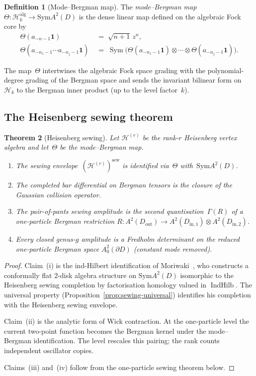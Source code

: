 \documentclass[11pt,reqno]{amsart}
\newtheorem{theorem}{Theorem}[section]
\theoremstyle{definition}
\newtheorem{definition}[theorem]{Definition}
\theoremstyle{remark}
\newcommand{\cH}{\mathcal{H}}
\newcommand{\Sym}{\mathrm{Sym}}
\newcommand{\GG}{\Gamma}
\numberwithin{equation}{section}
\begin{document}
\begin{definition}[Mode--Bergman map]\label{def:theta-map}
The \emph{mode--Bergman map}
$\Theta \colon \cH_k^{\mathrm{alg}} \to \Sym A^2(D)$
is the dense linear map defined on the algebraic Fock core by
\begin{align*}
\Theta(a_{-n-1}\mathbf{1})
&\;=\;
\sqrt{n+1}\, z^n,\\
\Theta(a_{-n_1-1}\cdots a_{-n_j-1}\mathbf{1})
&\;=\;
\operatorname{Sym}\bigl(\Theta(a_{-n_1-1}\mathbf{1})
\otimes \cdots \otimes
\Theta(a_{-n_j-1}\mathbf{1})\bigr).
\end{align*}
\end{definition}

The map~$\Theta$ intertwines the algebraic Fock space grading
with the polynomial-degree grading of the Bergman space and
sends the invariant bilinear form on~$\cH_k$ to the Bergman
inner product (up to the level factor~$k$).

\subsection{The Heisenberg sewing theorem}
\label{subsec:heisenberg-sewing-theorem}

\begin{theorem}[Heisenberg sewing]
\label{thm:heisenberg-sewing-vol1}
Let $\cH^{(r)}$ be the rank-$r$ Heisenberg vertex algebra and
let~$\Theta$ be the mode--Bergman map.
\begin{enumerate}[label=\textup{(\roman*)}]
\item The sewing envelope~$(\cH^{(r)})^{\mathrm{sew}}$ is
identified via~$\Theta$ with~$\Sym A^2(D)$.
\item The completed bar differential on Bergman tensors is the
closure of the Gaussian collision operator.
\item The pair-of-pants sewing amplitude is the second
quantisation~$\GG(R)$ of a one-particle Bergman restriction
$R \colon A^2(D_{\mathrm{out}}) \to
A^2(D_{\mathrm{in},1}) \otimes A^2(D_{\mathrm{in},2})$.
\item Every closed genus-$g$ amplitude is a Fredholm
determinant on the reduced one-particle Bergman space
$A^2_0(\partial D)$ (constant mode removed).
\end{enumerate}
\end{theorem}

\begin{proof}
Claim~(i) is the ind-Hilbert identification of
Moriwaki~\cite{Moriwaki26b}, who constructs a conformally flat
2-disk algebra structure on $\Sym A^2(D)$ isomorphic to the
Heisenberg sewing completion by factorisation homology valued
in $\operatorname{IndHilb}$.  The universal property
(Proposition~\ref{prop:sewing-universal}) identifies his
completion with the Heisenberg sewing envelope.

Claim~(ii) is the analytic form of Wick contraction. At the
one-particle level the current two-point function becomes the
Bergman kernel under the mode--Bergman identification. The level
rescales this pairing; the rank counts independent oscillator
copies.

Claims~(iii) and~(iv) follow from the one-particle sewing
theorem below.
\end{proof}
\end{document}
